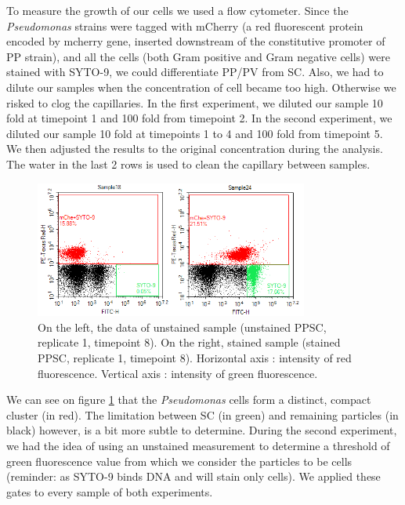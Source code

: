 \documentclass[a4paper, 10pt, conference]{ieeeconf}   %
\begin{document}
To measure the growth of our cells we used a flow cytometer. 
Since the \textit{Pseudomonas} strains were tagged with mCherry (a red fluorescent protein encoded by mcherry gene, inserted downstream of the constitutive promoter of PP strain), and all the cells (both Gram positive and Gram negative cells) were stained with SYTO-9, we could differentiate PP/PV from SC. Also, we had to dilute our samples when the concentration of cell became too high. Otherwise we risked to clog the capillaries.
In the first experiment, we diluted our sample 10 fold at timepoint 1 and 100 fold from timepoint 2. In the second experiment, we diluted our sample 10 fold at timepoints 1 to 4 and 100 fold from timepoint 5.
We then adjusted the results to the original concentration during the analysis. The water in the last 2 rows is used to clean the capillary between samples.
%  

\begin{figure} [H]
	\centering
	 
		\includegraphics[width=9cm]{t8_unstained_ppsc11.PNG}
		\caption{On the left, the data of unstained sample (unstained PPSC, replicate 1, timepoint 8). On the right, stained sample (stained PPSC, replicate 1, timepoint 8). Horizontal axis : intensity of red fluorescence. Vertical axis : intensity of green fluorescence.}
		\label{scatterplot}
	  
\end{figure}

We can see on figure \ref{scatterplot} that the \textit{Pseudomonas} cells form a distinct, compact cluster (in red). The limitation between SC (in green) and remaining particles (in black) however, is a bit more subtle to determine. During the second experiment, we had the idea of using an unstained measurement to determine a threshold of green fluorescence value from which we consider the particles to be cells (reminder: as SYTO-9 binds DNA and will stain only cells). We applied these gates to every sample
of both experiments.
\end{document}
